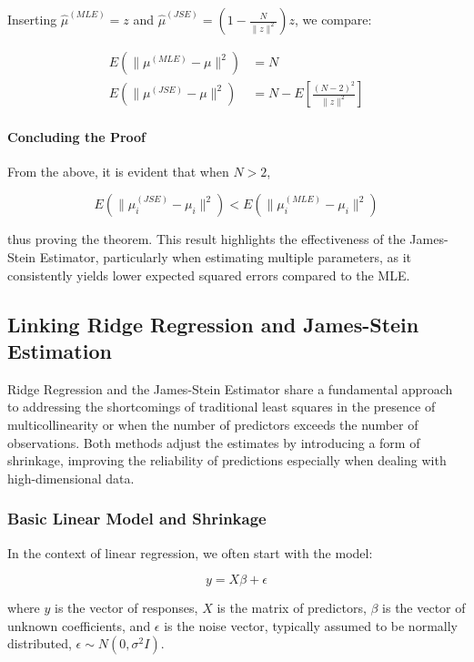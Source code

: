 Inserting \(\hat\mu^{(MLE)} = z\) and \(\hat\mu^{(JSE)} = \left(1-\frac{N}{\|z\|^2}\right)z\), we compare:

\begin{align}
    E(\|\mu^{(MLE)} - \mu\|^2) &= N \\
    E(\|\mu^{(JSE)} - \mu\|^2) &= N - E\left[\frac{(N-2)^2}{\|z\|^2}\right]
\end{align}

\paragraph{Concluding the Proof}

From the above, it is evident that when \(N > 2\),

\begin{equation}
    E(\|\mu_i^{(JSE)} - \mu_i\|^2) < E(\|\mu_i^{(MLE)} - \mu_i\|^2)
\end{equation}

thus proving the theorem. This result highlights the effectiveness of the James-Stein Estimator, particularly when estimating multiple parameters, as it consistently yields lower expected squared errors compared to the MLE.

\subsection{Linking Ridge Regression and James-Stein Estimation}

Ridge Regression and the James-Stein Estimator share a fundamental approach to addressing the shortcomings of traditional least squares in the presence of multicollinearity or when the number of predictors exceeds the number of observations. Both methods adjust the estimates by introducing a form of shrinkage, improving the reliability of predictions especially when dealing with high-dimensional data.

\subsubsection{Basic Linear Model and Shrinkage}

In the context of linear regression, we often start with the model:

\begin{equation}
    y = X\beta + \epsilon
\end{equation}

where \( y \) is the vector of responses, \( X \) is the matrix of predictors, \( \beta \) is the vector of unknown coefficients, and \( \epsilon \) is the noise vector, typically assumed to be normally distributed, \( \epsilon \sim N(0, \sigma^2I) \).

